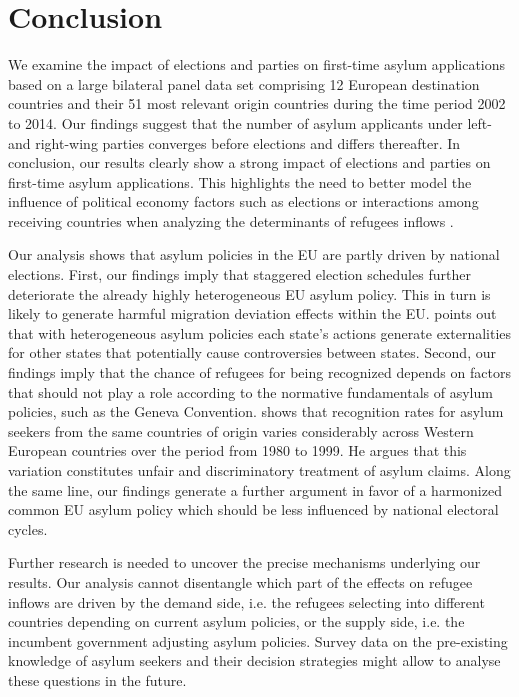 \documentclass[a4paper,12pt]{article}
\begin{document}
\section{Conclusion}\label{sec:conclusion}

We examine the impact of elections and parties on first-time asylum applications based on a large bilateral panel data set comprising 12 European destination countries and their 51 most relevant origin countries during the time period 2002 to 2014. Our findings suggest that  the number of asylum applicants under left- and right-wing parties converges before elections and differs thereafter. In conclusion, our results clearly show a strong impact of elections and parties on first-time asylum applications. This highlights the need to better model the influence of political economy factors such as elections or interactions among receiving countries when analyzing the determinants of refugees inflows \citep{gorlach2017}. 

Our analysis shows that asylum policies in the EU are partly driven by national elections. First, our findings imply that staggered election schedules further deteriorate the already highly heterogeneous EU asylum policy. This in turn is likely to generate harmful migration deviation effects within the EU. \citet{thielemann2006} points out that with heterogeneous asylum policies each state's actions generate externalities for other states that potentially cause controversies between states. Second, our findings imply that the chance of refugees for being recognized depends on factors that should not play a role according to the normative fundamentals of asylum policies, such as the Geneva Convention. \citet{neumayer2005} shows that recognition rates for asylum seekers from the same countries of origin varies considerably across Western European countries over the period from 1980 to 1999. He argues that this variation constitutes unfair and discriminatory treatment of asylum claims. Along the same line, our findings generate a further argument in favor of a harmonized common EU asylum policy which should be less influenced by national electoral cycles. 



Further research is needed to uncover the precise mechanisms underlying our results. Our analysis cannot disentangle which part of the effects on refugee inflows are driven by the demand side, i.e. the refugees selecting into different countries depending on current asylum policies, or the supply side, i.e. the incumbent government adjusting asylum policies.  Survey data on the pre-existing knowledge of asylum seekers and their decision strategies might allow to analyse these questions in the future. 
 
\end{document}
